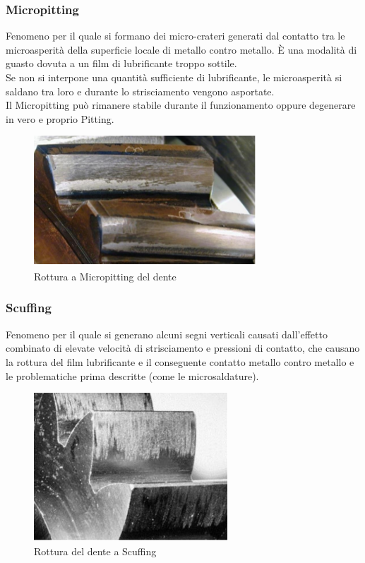 \subsubsection{Micropitting}
Fenomeno per il quale si formano dei micro-crateri generati dal contatto tra le microasperità della superficie locale di metallo contro metallo. È una modalità di guasto dovuta a un film di lubrificante troppo sottile. \\
Se non si interpone una quantità sufficiente di lubrificante, le microasperità si saldano tra loro e durante lo strisciamento vengono asportate.\\
Il Micropitting può rimanere stabile durante il funzionamento oppure degenerare in vero e proprio Pitting. 
\begin{figure}[h]
    \centering
    \includegraphics[scale=0.7]{Immagini/Micropitting.png}
    \caption{Rottura a Micropitting del dente}
    \label{fig:Micropitting}
\end{figure}
\subsubsection{Scuffing}
Fenomeno per il quale si generano alcuni segni verticali causati dall’effetto combinato di elevate velocità di strisciamento e pressioni di contatto, che causano la rottura del film lubrificante e il conseguente contatto metallo contro metallo e le problematiche prima descritte (come le microsaldature).
\begin{figure}[h]
    \centering
    \includegraphics[scale=0.7]{Immagini/Scuffing.png}
    \caption{Rottura del dente a Scuffing}
    \label{fig:Scuffing}
\end{figure}

